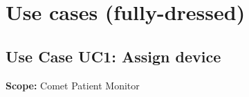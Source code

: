 \documentclass[fontsize=12pt,
               paper=a4,
               twoside=false,
               parskip=half,
               ]{scrartcl}
\begin{document}

\section{Use cases (fully-dressed)}


\subsection{Use Case UC1: Assign device}

\textbf{\textsf{Scope:}} Comet Patient Monitor






\end{document}
